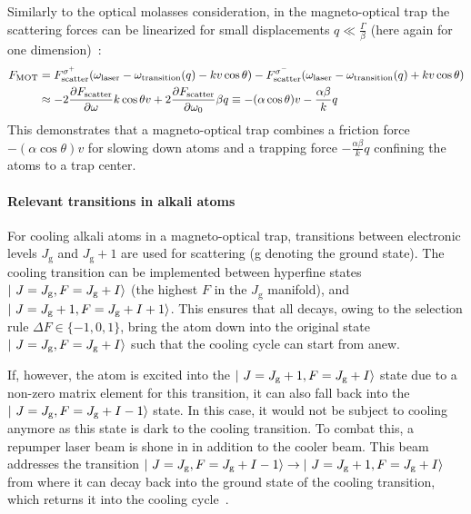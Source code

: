 Similarly to the optical molasses consideration, in the magneto-optical trap the scattering forces can be linearized for small displacements $q \ll \frac{\Gamma}{\beta}$ (here again for one dimension)~\cite{foot_atomic_2005}:
\begin{equation}\label{eq:mot_force}
    \begin{split}
        F_\text{MOT} &= F_\text{scatter}^{\sigma^+}(\omega_\text{laser} - \omega_\text{transition}(q) - kv \cos \theta) - F_\text{scatter}^{\sigma^-}(\omega_\text{laser} - \omega_\text{transition}(q) + kv \cos \theta)\\
        &\approx -2 \pdv{F_\text{scatter}}{\omega} k\cos \theta v + 2 \pdv{F_\text{scatter}}{\omega_0} \beta q  \equiv - (\alpha \cos \theta) v - \frac{\alpha \beta}{k} q
    \end{split}
\end{equation}
This demonstrates that a magneto-optical trap combines a friction force $-(\alpha \cos \theta) v$ for slowing down atoms and a trapping force $- \frac{\alpha \beta}{k} q$ confining the atoms to a trap center.

\paragraph{Relevant transitions in alkali atoms}
\sloppy For cooling alkali atoms in a magneto-optical trap, transitions between electronic levels $J_\text{g}$ and $J_\text{g} + 1$ are used for scattering (g denoting the ground state). The cooling transition can be imple\-mented between hyperfine states $\Ket{~J = J_\text{g}, F = J_\text{g} + I}$ (the highest $F$ in the $J_\text{g}$ manifold), and $\Ket{~J = J_\text{g} + 1, F= J_\text{g} + I + 1}$. This ensures that all decays, owing to the selection rule $\Delta F \in \{-1, 0, 1\}$,  bring the atom down into the original state $\Ket{~J = J_\text{g}, F = J_\text{g} + I}$ such that the cooling cycle can start from anew.

If, however, the atom is excited into the $\Ket{~J = J_\text{g} + 1, F = J_\text{g} + I}$ state due to a non-zero matrix element for this transition, it can also fall back into the $\Ket{~J = J_\text{g}, F = J_\text{g} + I - 1}$ state. In this case, it would not be subject to cooling anymore as this state is dark to the cooling transition. To combat this, a repumper laser beam is shone in in addition to the cooler beam. This beam addresses the transition $\Ket{~J = J_\text{g}, F = J_\text{g} + I - 1} \rightarrow \Ket{~J = J_\text{g} + 1, F = J_\text{g} + I}$ from where it can decay back into the ground state of the cooling transition, which returns it into the cooling cycle~\cite{metcalf_laser_1999}.

